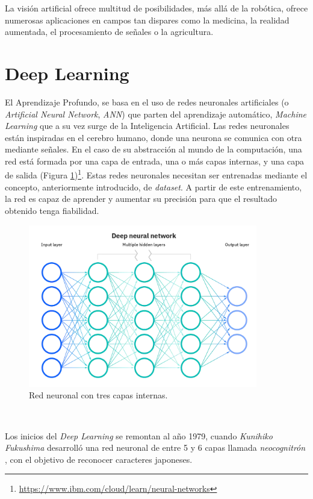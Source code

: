 La visión artificial ofrece multitud de posibilidades, más allá de la robótica, ofrece numerosas aplicaciones en campos tan dispares como la medicina, la realidad aumentada, el procesamiento de señales o la agricultura.\\

\section{Deep Learning}
\label{sec:deeplearning}
El Aprendizaje Profundo, se basa en el uso de redes neuronales artificiales (o {\textit{Artificial Neural Network}}, \textit{ANN}) que parten del aprendizaje automático, \textit{Machine Learning} que a su vez surge de la Inteligencia Artificial. Las redes neuronales están inspiradas en el cerebro humano, donde una neurona se comunica con otra mediante señales. En el caso de su abstracción al mundo de la computación, una red está formada por una capa de entrada, una o más capas internas, y una capa de salida (Figura \ref{fig:neuralnetwork})\footnote{\url{https://www.ibm.com/cloud/learn/neural-networks}}. Estas redes neuronales necesitan ser entrenadas mediante el concepto, anteriormente introducido, de \textit{dataset}. A partir de este entrenamiento, la red es capaz de aprender y aumentar su precisión para que el resultado obtenido tenga fiabilidad.\\

\begin{figure} [h!]
	\begin{center}
		\includegraphics[width=10cm]{figs/neuralnetwork}
	\end{center}
	\caption{Red neuronal con tres capas internas.}
	\label{fig:neuralnetwork}
\end{figure}\

Los inicios del \textit{Deep Learning} se remontan al año 1979, cuando \textit{Kunihiko Fukushima} desarrolló una red neuronal de entre 5 y 6 capas llamada \textit{neocognitrón} \cite{neocognitron}, con el objetivo de reconocer caracteres japoneses.\\

